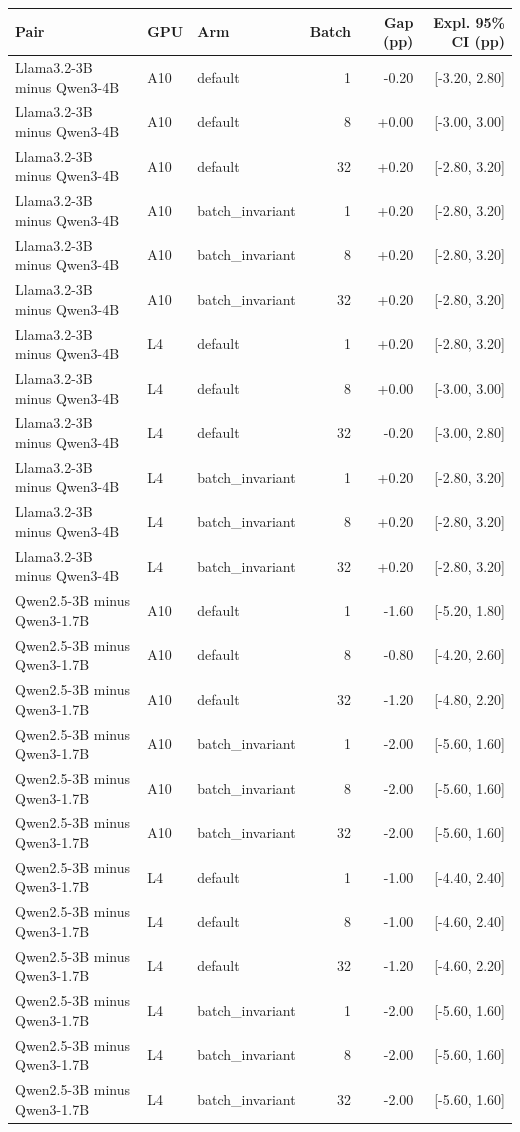 \begin{tabular}{lllrrr}
\toprule
Pair & GPU & Arm & Batch & Gap (pp) & Expl. 95\% CI (pp) \\
\midrule
Llama3.2-3B minus Qwen3-4B & A10 & default & 1 & -0.20 & [-3.20, 2.80] \\
Llama3.2-3B minus Qwen3-4B & A10 & default & 8 & +0.00 & [-3.00, 3.00] \\
Llama3.2-3B minus Qwen3-4B & A10 & default & 32 & +0.20 & [-2.80, 3.20] \\
Llama3.2-3B minus Qwen3-4B & A10 & batch\_invariant & 1 & +0.20 & [-2.80, 3.20] \\
Llama3.2-3B minus Qwen3-4B & A10 & batch\_invariant & 8 & +0.20 & [-2.80, 3.20] \\
Llama3.2-3B minus Qwen3-4B & A10 & batch\_invariant & 32 & +0.20 & [-2.80, 3.20] \\
Llama3.2-3B minus Qwen3-4B & L4 & default & 1 & +0.20 & [-2.80, 3.20] \\
Llama3.2-3B minus Qwen3-4B & L4 & default & 8 & +0.00 & [-3.00, 3.00] \\
Llama3.2-3B minus Qwen3-4B & L4 & default & 32 & -0.20 & [-3.00, 2.80] \\
Llama3.2-3B minus Qwen3-4B & L4 & batch\_invariant & 1 & +0.20 & [-2.80, 3.20] \\
Llama3.2-3B minus Qwen3-4B & L4 & batch\_invariant & 8 & +0.20 & [-2.80, 3.20] \\
Llama3.2-3B minus Qwen3-4B & L4 & batch\_invariant & 32 & +0.20 & [-2.80, 3.20] \\
Qwen2.5-3B minus Qwen3-1.7B & A10 & default & 1 & -1.60 & [-5.20, 1.80] \\
Qwen2.5-3B minus Qwen3-1.7B & A10 & default & 8 & -0.80 & [-4.20, 2.60] \\
Qwen2.5-3B minus Qwen3-1.7B & A10 & default & 32 & -1.20 & [-4.80, 2.20] \\
Qwen2.5-3B minus Qwen3-1.7B & A10 & batch\_invariant & 1 & -2.00 & [-5.60, 1.60] \\
Qwen2.5-3B minus Qwen3-1.7B & A10 & batch\_invariant & 8 & -2.00 & [-5.60, 1.60] \\
Qwen2.5-3B minus Qwen3-1.7B & A10 & batch\_invariant & 32 & -2.00 & [-5.60, 1.60] \\
Qwen2.5-3B minus Qwen3-1.7B & L4 & default & 1 & -1.00 & [-4.40, 2.40] \\
Qwen2.5-3B minus Qwen3-1.7B & L4 & default & 8 & -1.00 & [-4.60, 2.40] \\
Qwen2.5-3B minus Qwen3-1.7B & L4 & default & 32 & -1.20 & [-4.60, 2.20] \\
Qwen2.5-3B minus Qwen3-1.7B & L4 & batch\_invariant & 1 & -2.00 & [-5.60, 1.60] \\
Qwen2.5-3B minus Qwen3-1.7B & L4 & batch\_invariant & 8 & -2.00 & [-5.60, 1.60] \\
Qwen2.5-3B minus Qwen3-1.7B & L4 & batch\_invariant & 32 & -2.00 & [-5.60, 1.60] \\
\bottomrule
\end{tabular}
